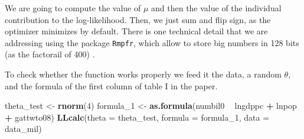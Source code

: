 \documentclass[]{book}
\newenvironment{Shaded}{\begin{snugshade}}{\end{snugshade}}
\newcommand{\KeywordTok}[1]{\textcolor[rgb]{0.13,0.29,0.53}{\textbf{#1}}}
\newcommand{\DataTypeTok}[1]{\textcolor[rgb]{0.13,0.29,0.53}{#1}}
\newcommand{\DecValTok}[1]{\textcolor[rgb]{0.00,0.00,0.81}{#1}}
\newcommand{\StringTok}[1]{\textcolor[rgb]{0.31,0.60,0.02}{#1}}
\newcommand{\CommentTok}[1]{\textcolor[rgb]{0.56,0.35,0.01}{\textit{#1}}}
\newcommand{\ControlFlowTok}[1]{\textcolor[rgb]{0.13,0.29,0.53}{\textbf{#1}}}
\newcommand{\OperatorTok}[1]{\textcolor[rgb]{0.81,0.36,0.00}{\textbf{#1}}}
\newcommand{\NormalTok}[1]{#1}
\begin{document}
We are going to compute the value of \(\mu\) and then the value of the
individual contribution to the log-likelihood. Then, we just sum and
flip sign, as the optimizer minimizes by default. There is one technical
detail that we are addressing using the package \texttt{Rmpfr}, which
allow to store big numbers in 128 bits (as the factorail of 400)
\citep{R-Rmpfr}.

\begin{Shaded}
\end{Shaded}

To check whether the function works properly we feed it the data, a
random \(\theta\), and the formula of the first column of table I in the
paper.

\begin{Shaded}
\begin{Highlighting}[]
\NormalTok{theta_test <-}\StringTok{ }\KeywordTok{rnorm}\NormalTok{(}\DecValTok{4}\NormalTok{)}
\NormalTok{formula_}\DecValTok{1}\NormalTok{ <-}\StringTok{ }\KeywordTok{as.formula}\NormalTok{(numbil0 }\OperatorTok{~}\StringTok{ }\NormalTok{lngdppc }\OperatorTok{+}\StringTok{ }\NormalTok{lnpop }\OperatorTok{+}\StringTok{ }\NormalTok{gattwto08)}
\KeywordTok{LLcalc}\NormalTok{(}\DataTypeTok{theta =}\NormalTok{ theta_test, }\DataTypeTok{formula =}\NormalTok{ formula_}\DecValTok{1}\NormalTok{, }\DataTypeTok{data =}\NormalTok{ data_mil)}
\end{Highlighting}
\end{Shaded}
\end{document}
